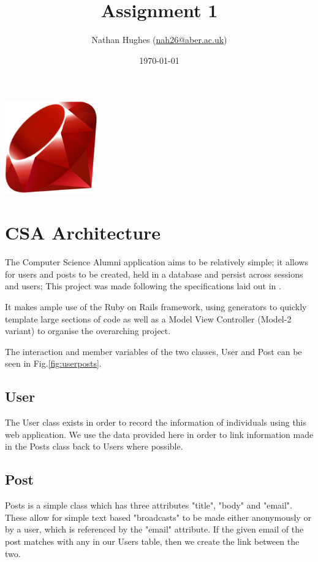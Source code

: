 \documentclass[a4paper]{article}
\author{Nathan Hughes (\href{mailto:nah31@aber.ac.uk}{nah26@aber.ac.uk})}
\date{\today}
\title{Assignment 1}
\begin{document}
\maketitle
\vspace{2cm}

\begin{center}
\includegraphics[width=4cm]{./ruby.png}
\end{center}

\clearpage
\tableofcontents
\clearpage

\section{CSA Architecture}
\label{sec-1}
The Computer Science Alumni application aims to be relatively simple; it allows for users and posts 
to be created, held in a database and persist across sessions and users; This project was made 
following the specifications laid out in \cite{loftus17_requir_cs_alumn_applic}. 

It makes ample use of the Ruby on Rails framework, using generators to quickly template large sections
of code as well as a Model View Controller (Model-2 variant) to organise the overarching project.

The interaction and member variables of the two classes, User and Post can be
 seen in Fig.\ref{fig:userposts}.

\subsection{User}
\label{sec-1-1}
The User class exists in order to record the information of individuals using this web application.
We use the data provided here in order to link information made in the Posts class back to Users
where possible. 


\subsection{Post}
\label{sec-1-2}
Posts is a simple class which has three attributes "title", "body" and "email". These allow for simple
text based "broadcasts" to be made either anonymously or by a user, which is referenced by the "email"
attribute. If the given email of the post matches with any in our Users table, then we create the link
between the two.
\end{document}
